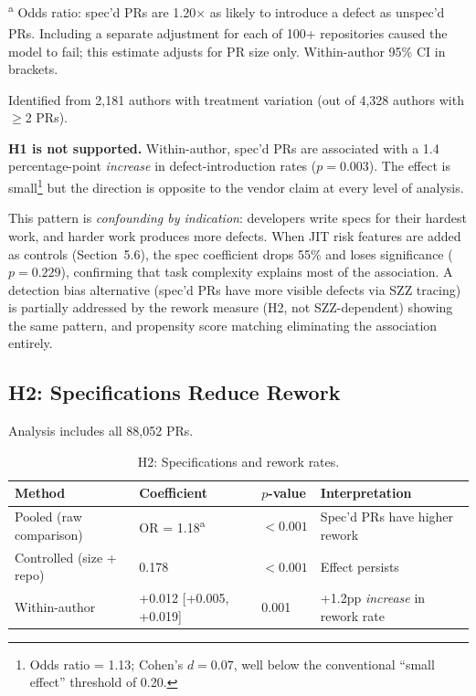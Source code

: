 \documentclass[a4paper,UKenglish,cleveref,autoref,thm-restate]{lipics-v2021}
\begin{document}
{\small \textsuperscript{a} Odds ratio: spec'd PRs are 1.20$\times$ as likely to introduce a defect as unspec'd PRs. \textsuperscript{\dag} Including a separate adjustment for each of 100+ repositories caused the model to fail; this estimate adjusts for PR size only. Within-author 95\% CI in brackets.}

Identified from 2,181 authors with treatment variation (out of 4,328 authors with $\geq$2 PRs).

\textbf{H1 is not supported.} Within-author, spec'd PRs are associated with a 1.4 percentage-point \emph{increase} in defect-introduction rates ($p = 0.003$). The effect is small\footnote{Odds ratio = 1.13; Cohen's $d = 0.07$, well below the conventional ``small effect'' threshold of 0.20.} but the direction is opposite to the vendor claim at every level of analysis.

This pattern is \emph{confounding by indication}: developers write specs for their hardest work, and harder work produces more defects. When JIT risk features are added as controls (Section~5.6), the spec coefficient drops 55\% and loses significance ($p = 0.229$), confirming that task complexity explains most of the association. A detection bias alternative (spec'd PRs have more visible defects via SZZ tracing) is partially addressed by the rework measure (H2, not SZZ-dependent) showing the same pattern, and propensity score matching eliminating the association entirely.

\subsection{H2: Specifications Reduce Rework}

\noindent
Analysis includes all 88,052 PRs.

\begin{table}[t]
\centering
\caption{H2: Specifications and rework rates.}
\label{tab:h2}
\begin{tabular}{@{}llll@{}}
\toprule
\textbf{Method} & \textbf{Coefficient} & \textbf{$p$-value} & \textbf{Interpretation} \\
\midrule
Pooled (raw comparison) & OR = 1.18\textsuperscript{a} & $< 0.001$ & Spec'd PRs have higher rework \\
Controlled (size + repo) & 0.178 & $< 0.001$ & Effect persists \\
Within-author & +0.012 [+0.005, +0.019] & 0.001 & +1.2pp \emph{increase} in rework rate \\
\bottomrule
\end{tabular}
\end{table}
\end{document}
